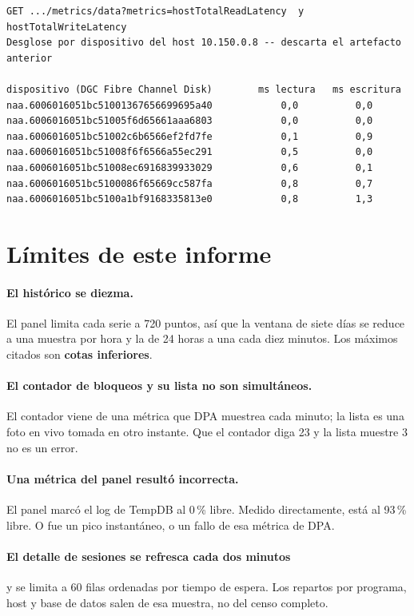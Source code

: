 \documentclass[11pt,a4paper]{article}
\begin{document}
\begin{lstlisting}[style=salida]
GET .../metrics/data?metrics=hostTotalReadLatency  y  hostTotalWriteLatency
Desglose por dispositivo del host 10.150.0.8 -- descarta el artefacto anterior

dispositivo (DGC Fibre Channel Disk)        ms lectura   ms escritura
naa.6006016051bc51001367656699695a40            0,0          0,0
naa.6006016051bc51005f6d65661aaa6803            0,0          0,0
naa.6006016051bc51002c6b6566ef2fd7fe            0,1          0,9
naa.6006016051bc51008f6f6566a55ec291            0,5          0,0
naa.6006016051bc51008ec6916839933029            0,6          0,1
naa.6006016051bc5100086f65669cc587fa            0,8          0,7
naa.6006016051bc5100a1bf9168335813e0            0,8          1,3
\end{lstlisting}

\newpage
\section{Límites de este informe}

\paragraph{El histórico se diezma.} El panel limita cada serie a 720 puntos,
así que la ventana de siete días se reduce a una muestra por hora y la de 24
horas a una cada diez minutos. Los máximos citados son \textbf{cotas
inferiores}.

\paragraph{El contador de bloqueos y su lista no son simultáneos.} El
contador viene de una métrica que DPA muestrea cada minuto; la lista es una
foto en vivo tomada en otro instante. Que el contador diga 23 y la lista
muestre 3 no es un error.

\paragraph{Una métrica del panel resultó incorrecta.} El panel marcó el log
de TempDB al 0\,\% libre. Medido directamente, está al 93\,\% libre. O fue
un pico instantáneo, o un fallo de esa métrica de DPA.

\paragraph{El detalle de sesiones se refresca cada dos minutos} y se limita
a 60 filas ordenadas por tiempo de espera. Los repartos por programa, host y
base de datos salen de esa muestra, no del censo completo.
\end{document}

